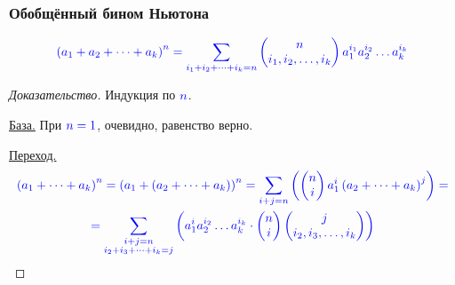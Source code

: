 \begin{frame}[t]
    \frametitle{Обобщённый бином Ньютона}
    \small
    \begin{theorem}[]
        \[
            \color{blue} \left( a_1 + a_2 + \dots + a_k \right)^n = \sum_{i_1 + i_2 + \dots + i_k = n}  \begin{pmatrix} n \\ i_1, i_2, \dots, i_k \end{pmatrix} a_1^{i_1}a_2^{i_2} \dots a_k^{i_k} 
        \]
    \end{theorem}

    \begin{proof}[Доказательство]
        \renewcommand{\qedsymbol}{}
        Индукция по $\color{blue} n$.
        
        \underline{База.} При $\color{blue} n=1$, очевидно, равенство верно.

         \underline{Переход.} 
         \begin{gather*}
             \color{blue} \left( a_1 + \dots + a_k \right) ^{n} = \left( a_1 + \left( a_2 + \dots + a_k \right)  \right)^{n} = \sum_{i+j = n} \left(  \begin{pmatrix} n \\ i \end{pmatrix} a_1^{i} \left( a_2 + \dots + a_k \right)^{j} \right) = \\
             \color{blue} = \sum_{\substack{i+j = n \\ i_2 + i_3 + \dots + i_k = j}} \left( a_1^{i} a_2^{i_2} \dots a_k ^{i_k} \cdot \begin{pmatrix} n \\ i \end{pmatrix} \begin{pmatrix} j \\ i_2, i_3, \dots , i_k \end{pmatrix}  \right) 
        \end{gather*}
    \end{proof}
    
\end{frame}

